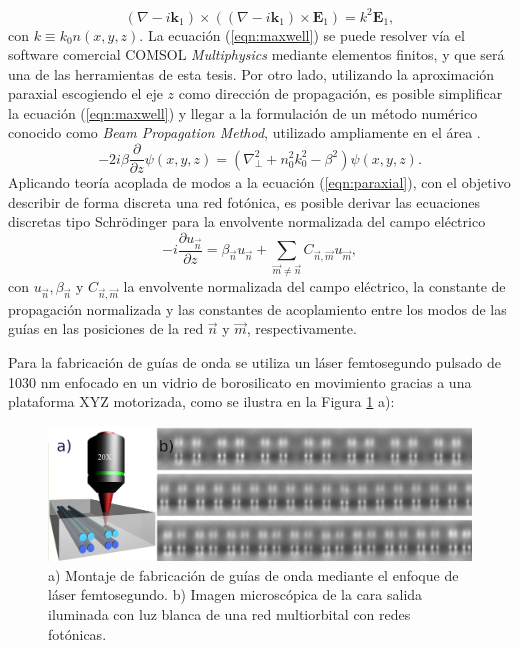 \documentclass{article}
\begin{document}
\begin{equation}
	(\nabla-i\textbf{k}_1)\times((\nabla-i\textbf{k}_1)\times \textbf{E}_1) = k^2 \textbf{E}_1,
	 \label{eqn:maxwell}
\end{equation}
con $k \equiv k_0 n(x,y,z)$.
La ecuación (\ref{eqn:maxwell}) se puede resolver vía el software comercial COMSOL \textit{Multiphysics} mediante elementos finitos, y que será una de las herramientas de esta tesis. Por otro lado, utilizando la aproximación paraxial escogiendo el eje $z$  como dirección de propagación, es posible simplificar la ecuación (\ref{eqn:maxwell}) y llegar a la formulación de un método numérico conocido como \textit{Beam Propagation Method}, utilizado ampliamente en el área \cite{bics, interorbital, OAMCaging, vortex, bpm}.
\begin{equation}
	-2i\beta\frac{\partial}{\partial z}\psi(x,y,z) = \left(\nabla_\perp^2 + n_0^2 k_0^2 - \beta^2\right) \psi (x,y,z). \label{eqn:paraxial}
\end{equation}
Aplicando teoría acoplada de modos \cite{coupledmodetheory} a la ecuación (\ref{eqn:paraxial}), con el objetivo describir de forma discreta una red fotónica, es posible derivar las ecuaciones discretas tipo Schrödinger para la envolvente normalizada del campo eléctrico \cite{discretesolitons, artificialFB, FBdynamics}
\begin{equation}
	-i\frac{\partial u_{\vec{n}} }{\partial z} = \beta_{\vec{n}}u_{\vec{n}} + \sum_{\vec{m}\neq\vec{n}} C_{\vec{n},\vec{m}}u_{\vec{m}}, \label{eqn:CMT}
\end{equation}
con $u_{\vec{n}}, \beta_{\vec{n}}$ y $C_{\vec{n}, \vec{m}}$ la envolvente normalizada del campo eléctrico, la constante de propagación normalizada y las constantes de acoplamiento entre los modos de las guías en las posiciones de la red $\vec{n}$ y $\vec{m}$, respectivamente.


Para la fabricación de guías de onda se utiliza un láser femtosegundo pulsado de 1030 nm enfocado en un vidrio de borosilicato en movimiento gracias a una plataforma XYZ motorizada, como se ilustra en la Figura \ref{fig:femtosetup} a): 

\begin{figure}[H]
	\centering
	\includegraphics[width=0.9\linewidth]{./media/femtosetup.png}
	\caption{a) Montaje de fabricación de guías de onda mediante el enfoque de láser femtosegundo. b) Imagen microscópica de la cara salida iluminada con luz blanca de una red multiorbital con redes fotónicas. \label{fig:femtosetup}}
\end{figure}
\end{document}
